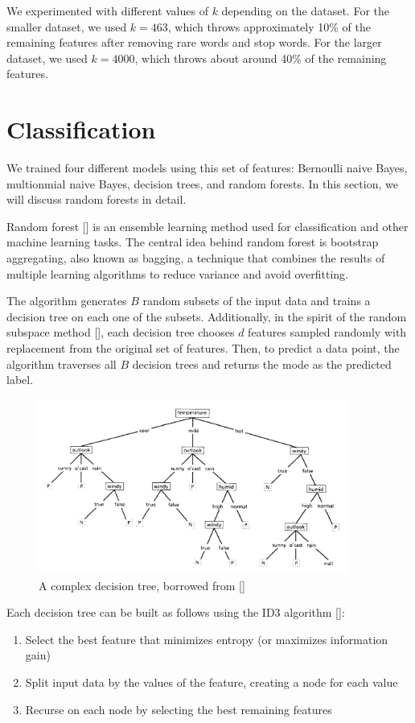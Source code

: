 \documentclass{article} %
\begin{document}
We experimented with different values of $k$ depending on the dataset. For the smaller dataset, we used $k = 463$, which throws approximately 10\% of the remaining features after removing rare words and stop words. For the larger dataset, we used $k = 4000$, which throws about around 40\% of the remaining features.

\section{Classification}

We trained four different models using this set of features: Bernoulli naive Bayes, multionmial naive Bayes, decision trees, and random forests. In this section, we will discuss random forests in detail.

Random forest [] is an ensemble learning method used for classification and other machine learning tasks. The central idea behind random forest is bootstrap aggregating, also known as bagging, a technique that combines the results of multiple learning algorithms to reduce variance and avoid overfitting.

The algorithm generates $B$ random subsets of the input data and trains a decision tree on each one of the subsets. Additionally, in the spirit of the random subspace method [], each decision tree chooses $d$ features sampled randomly with replacement from the original set of features. Then, to predict a data point, the algorithm traverses all $B$ decision trees and returns the mode as the predicted label.

\begin{figure}[H]
  \centering
  \includegraphics[width=0.9\textwidth]{dt.png}
  \caption{A complex decision tree, borrowed from []}
\end{figure}

Each decision tree can be built as follows using the ID3 algorithm []:
\begin{enumerate}
\item Select the best feature that minimizes entropy (or maximizes information gain)
\item Split input data by the values of the feature, creating a node for each value
\item Recurse on each node by selecting the best remaining features
\end{enumerate}
\end{document}
